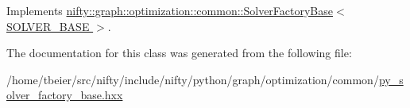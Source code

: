 Implements \hyperlink{classnifty_1_1graph_1_1optimization_1_1common_1_1SolverFactoryBase_ad8946541bdc12fcd340c3049662d8f59}{nifty\+::graph\+::optimization\+::common\+::\+Solver\+Factory\+Base$<$ S\+O\+L\+V\+E\+R\+\_\+\+B\+A\+S\+E $>$}.



The documentation for this class was generated from the following file\+:\begin{DoxyCompactItemize}
\item 
/home/tbeier/src/nifty/include/nifty/python/graph/optimization/common/\hyperlink{py__solver__factory__base_8hxx}{py\+\_\+solver\+\_\+factory\+\_\+base.\+hxx}\end{DoxyCompactItemize}
